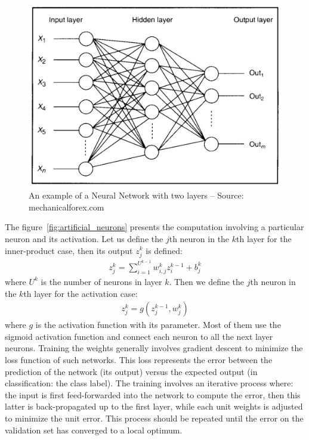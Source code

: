 \documentclass[a4paper,12pt]{report}
\begin{document}
\begin{figure}[t]
    \begin{center}
        \includegraphics{thesis_figures/NN.jpg}
    \end{center}
    \caption{An example of a Neural Network with two layers -- Source: mechanicalforex.com}
    \label{fig:neural_network}
\end{figure}

The figure~\ref{fig:artificial_neurons} presents the computation involving a particular neuron and its activation.
Let us define the $j$th neuron in the $k$th layer for the inner-product case, then its output $z^k_j$ is defined:
\begin{eqnarray}
    z^k_j = \sum_{i=1}^{U^{k-1}} w^k_{i,j} z^{k-1}_i + b^k_j
\end{eqnarray}
where $U^k$ is the number of neurons in layer $k$.
Then we define the $j$th neuron in the $k$th layer for the activation case:
\begin{eqnarray}
    z^k_j = g(z^{k-1}_j, w^k_{j})
\end{eqnarray}
where $g$ is the activation function with its parameter.
Most of them use the sigmoid activation function and connect each neuron to all the next layer neurons.
Training the weights generally involves gradient descent to minimize the loss function of such networks.
This loss represents the error between the prediction of the network (its output) versus the expected output (in classification: the class label).
The training involves an iterative process where: the input is first feed-forwarded into the network to compute the error, then this latter is back-propagated up to the first layer, while each unit weights is adjusted to minimize the unit error.
This process should be repeated until the error on the validation set has converged to a local optimum.
\end{document}
